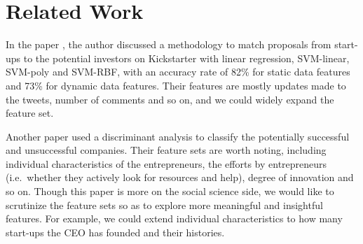 \section{Related Work}\label{related-work}

In the paper \cite{an2014recommending}, the author discussed a
methodology to match proposals from start-ups to the potential investors
on Kickstarter with linear regression, SVM-linear, SVM-poly and SVM-RBF,
with an accuracy rate of 82\% for static data features and 73\% for
dynamic data features. Their features are mostly updates made to the
tweets, number of comments and so on, and we could widely expand the
feature set.

Another paper \cite{gartner1999predicting} used a discriminant analysis
to classify the potentially successful and unsuccessful companies. Their
feature sets are worth noting, including individual characteristics of
the entrepreneurs, the efforts by entrepreneurs (i.e.~whether they
actively look for resources and help), degree of innovation and so on.
Though this paper is more on the social science side, we would like to
scrutinize the feature sets so as to explore more meaningful and
insightful features. For example, we could extend individual
characteristics to how many start-ups the CEO has founded and their
histories.
